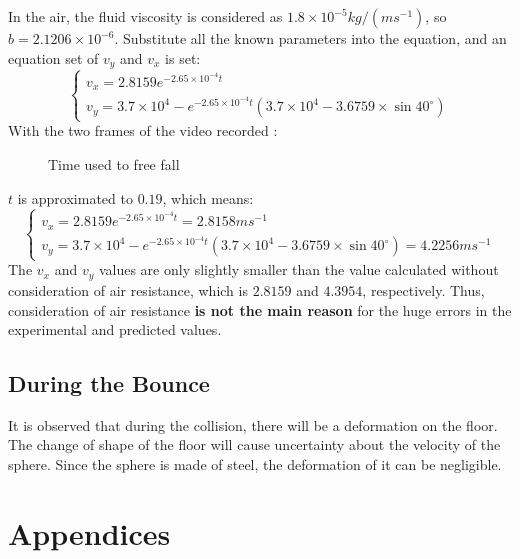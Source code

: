 \documentclass{article}
\begin{document}
        In the air, the fluid viscosity is considered as $1.8\times10^{-5}kg/(ms^{-1})$, so $b = 2.1206\times 10^{-6}$. Substitute all the known parameters into the equation, and an equation set of $v_y$ and $v_x$ is set:
        \begin{equation}
            \begin{cases}
               v_x = 2.8159e^{-2.65\times10^{-4}t} \\
               v_y = 3.7\times10^4 - e^{-2.65\times10^{-4}t}(3.7\times10^4-3.6759\times\sin{40^\circ}) \nonumber 
            \end{cases}
        \end{equation}
        With the two frames of the video\cite{youtube} recorded :
        \begin{figure}[H]
            \centering
            \caption{Time used to free fall}
        \end{figure}
        $t$ is approximated to $0.19$, which means:
        \begin{equation}
           \begin{cases}
               v_x = 2.8159e^{-2.65\times10^{-4}t} = 2.8158ms^{-1} \\
               v_y = 3.7\times10^4 - e^{-2.65\times10^{-4}t}(3.7\times10^4-3.6759\times\sin{40^\circ}) = 4.2256ms^{-1} 
           \end{cases} 
        \end{equation}
        The $v_x$ and $v_y$ values are only slightly smaller than the value calculated without consideration of air resistance, which is $2.8159$ and $4.3954$, respectively. Thus, consideration of air resistance \textbf{is not the main reason} for the huge errors in the experimental and predicted values.
    \subsection{During the Bounce}
         It is observed that during the collision, there will be a deformation on the floor. The change of shape of the floor will cause uncertainty about the velocity of the sphere. Since the sphere is made of steel, the deformation of it can be negligible. 
\newpage
\appendix
\section{Appendices}
\end{document}
